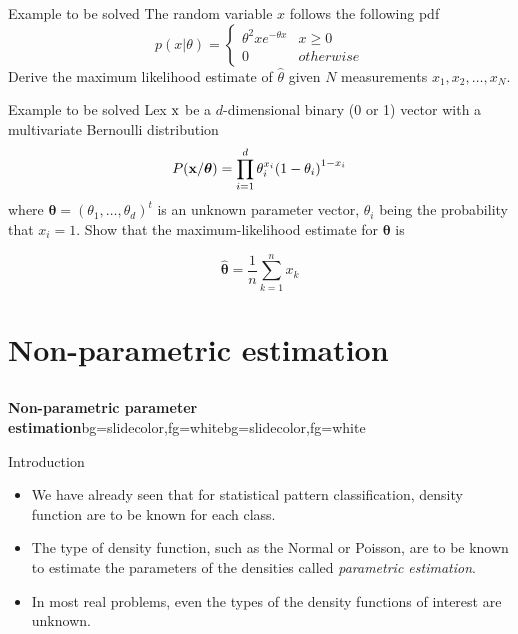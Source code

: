 \begin{frame}{Example to be solved}
The random variable $x$ follows the following pdf
\begin{equation*}
p(x|\theta ) = \left\{ {\begin{array}{*{20}{c}}
  {{\theta ^2}x{e^{ - \theta x}}}&{x \geqslant 0} \\ 
  0&{otherwise} 
\end{array}} \right.
\end{equation*}
Derive the maximum likelihood estimate of $\hat{\theta}$ given $N$ measurements $x_1,x_2,\ldots, x_N$.
\end{frame}

\begin{frame}{Example to be solved}
Lex ${\rm x}$  be a $d$-dimensional binary (0 or 1) vector with a multivariate Bernoulli distribution
\[P(\boldsymbol{\rm  x}/{\rm {\boldsymbol\theta} }) = \prod\limits_{i = 1}^d {\theta _i^{{x_i}}{{(1 - {\theta _i})}^{1 - {x_i}}}} \]
where $\boldsymbol\theta = (\theta_1,\ldots,\theta_d)^t$ is an unknown parameter vector, $\theta_i$ being the probability that $x_i=1$. Show that the maximum-likelihood estimate for $\boldsymbol\theta$ is

\[\boldsymbol{\hat{\theta}}=\frac{1}{n}\sum_{k=1}^{n}x_k\]
\end{frame}

\section{Non-parametric estimation}
\subsection{}

\begin{frame}{}
\begin{variableblock}{\centering \Large \textbf{\vspace{4pt}\newline Non-parametric parameter estimation\vspace{4pt}}}{bg=slidecolor,fg=white}{bg=slidecolor,fg=white}
\end{variableblock}
\end{frame}

\begin{frame}{Introduction}
\begin{itemize}
\setlength{\itemsep}{12pt}
\item We have already seen that for statistical pattern classification, density function are to be known for each class.
\item The type of density function, such as the Normal or Poisson, are to be known to estimate the parameters of the densities called \textit{\color{mycolor1}parametric estimation}.
\item In most real problems, even the types of the density functions of interest are unknown.
\end{itemize}
\end{frame}

